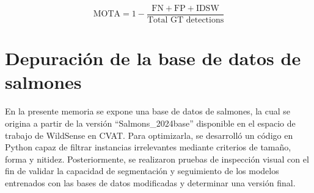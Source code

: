 \begin{equation}
\text{MOTA} = 1 - \dfrac{\text{FN} + \text{FP} + \text{IDSW}}{\text{Total GT detections}}
\label{eq:mota}
\end{equation}




\section{Depuración de la base de datos de salmones}
En la presente memoria se expone una base de datos de salmones, la cual se origina a partir de la versión ``Salmons\_2024base'' disponible en el espacio de trabajo de WildSense en CVAT. Para optimizarla, se desarrolló un código en Python capaz de filtrar instancias irrelevantes mediante criterios de tamaño, forma y nitidez. Posteriormente, se realizaron pruebas de inspección visual con el fin de validar la capacidad de segmentación y seguimiento de los modelos entrenados con las bases de datos modificadas y determinar una versión final.

